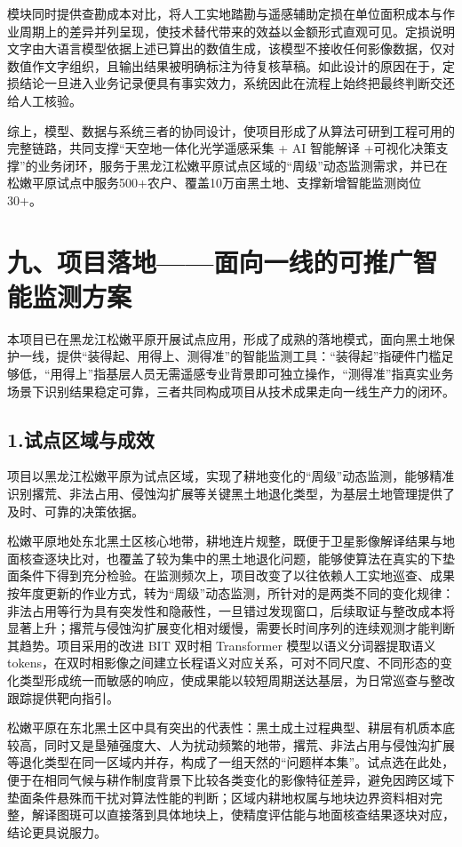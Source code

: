 \documentclass[12pt, a4paper]{ctexart}
\begin{document}
模块同时提供查勘成本对比，将人工实地踏勘与遥感辅助定损在单位面积成本与作业周期上的差异并列呈现，使技术替代带来的效益以金额形式直观可见。定损说明文字由大语言模型依据上述已算出的数值生成，该模型不接收任何影像数据，仅对数值作文字组织，且输出结果被明确标注为待复核草稿。如此设计的原因在于，定损结论一旦进入业务记录便具有事实效力，系统因此在流程上始终把最终判断交还给人工核验。

综上，模型、数据与系统三者的协同设计，使项目形成了从算法可研到工程可用的完整链路，共同支撑“天空地一体化光学遥感采集 + AI 智能解译 +可视化决策支撑”的业务闭环，服务于黑龙江松嫩平原试点区域的“周级”动态监测需求，并已在松嫩平原试点中服务500+农户、覆盖10万亩黑土地、支撑新增智能监测岗位30+。

\section{九、项目落地——面向一线的可推广智能监测方案}

本项目已在黑龙江松嫩平原开展试点应用，形成了成熟的落地模式，面向黑土地保护一线，提供“装得起、用得上、测得准”的智能监测工具：“装得起”指硬件门槛足够低，“用得上”指基层人员无需遥感专业背景即可独立操作，“测得准”指真实业务场景下识别结果稳定可靠，三者共同构成项目从技术成果走向一线生产力的闭环。

\subsection{1.试点区域与成效}

项目以黑龙江松嫩平原为试点区域，实现了耕地变化的“周级”动态监测，能够精准识别撂荒、非法占用、侵蚀沟扩展等关键黑土地退化类型，为基层土地管理提供了及时、可靠的决策依据。

松嫩平原地处东北黑土区核心地带，耕地连片规整，既便于卫星影像解译结果与地面核查逐块比对，也覆盖了较为集中的黑土地退化问题，能够使算法在真实的下垫面条件下得到充分检验。在监测频次上，项目改变了以往依赖人工实地巡查、成果按年度更新的作业方式，转为“周级”动态监测，所针对的是两类不同的变化规律：非法占用等行为具有突发性和隐蔽性，一旦错过发现窗口，后续取证与整改成本将显著上升；撂荒与侵蚀沟扩展变化相对缓慢，需要长时间序列的连续观测才能判断其趋势。项目采用的改进 BIT 双时相 Transformer 模型以语义分词器提取语义 tokens，在双时相影像之间建立长程语义对应关系，可对不同尺度、不同形态的变化类型形成统一而敏感的响应，使成果能以较短周期送达基层，为日常巡查与整改跟踪提供靶向指引。

松嫩平原在东北黑土区中具有突出的代表性：黑土成土过程典型、耕层有机质本底较高，同时又是垦殖强度大、人为扰动频繁的地带，撂荒、非法占用与侵蚀沟扩展等退化类型在同一区域内并存，构成了一组天然的“问题样本集”。试点选在此处，便于在相同气候与耕作制度背景下比较各类变化的影像特征差异，避免因跨区域下垫面条件悬殊而干扰对算法性能的判断；区域内耕地权属与地块边界资料相对完整，解译图斑可以直接落到具体地块上，使精度评估能与地面核查结果逐块对应，结论更具说服力。
\end{document}
